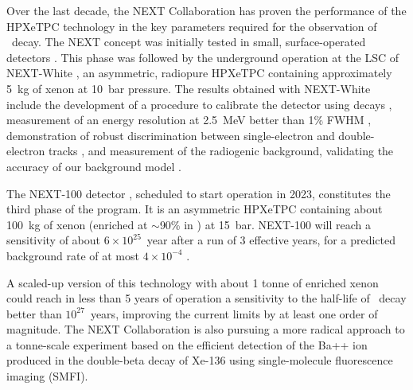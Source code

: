 Over the last decade, the NEXT Collaboration has proven the performance of the HPXeTPC technology in the key parameters required for the observation of \bbonu\ decay. The NEXT concept was initially tested in small, surface-operated detectors \cite{Alvarez:2012kua, Alvarez:2012xda, Alvarez:2013gxa, Lorca:2014sra, Ferrario:2015kta}. This phase was followed by the underground operation at the LSC of NEXT-{\sc White} \cite{Monrabal:2018xlr}, an asymmetric, radiopure HPXeTPC containing approximately 5~kg of xenon at 10~bar pressure. The results obtained with NEXT-{\sc White} include the development of a procedure to calibrate the detector using  decays \cite{Martinez-Lema:2018ibw}, measurement of an energy resolution at 2.5~MeV better than 1\% FWHM \cite{Renner:2018ttw, Renner:2019pfe}, demonstration of robust discrimination between single-electron and double-electron tracks \cite{Ferrario:2019kwg}, and measurement of the radiogenic background, validating the accuracy of our background model \cite{Novella:2018ewv,Novella:2019cne}.

The NEXT-100 detector \cite{Alvarez:2012sma}, scheduled to start operation in 2023, constitutes the third phase of the program. It is an asymmetric HPXeTPC containing about 100~kg of xenon (enriched at $\sim$90\% in ) at 15~bar. NEXT-100 will reach a sensitivity of about $6\times10^{25}$~year after a run of 3 effective years, for a predicted background rate of at most $4\times10^{-4}$ \ckky.

A scaled-up version of this technology with about 1 tonne of enriched xenon could reach in less than 5 years of operation a sensitivity to the half-life of \bbonu\ decay better than $10^{27}$~years, improving the current limits by at least one order of magnitude. The NEXT Collaboration is also pursuing a more radical approach to a tonne-scale experiment based on the efficient detection of the Ba++ ion produced in the double-beta decay of Xe-136 using single-molecule fluorescence imaging (SMFI).